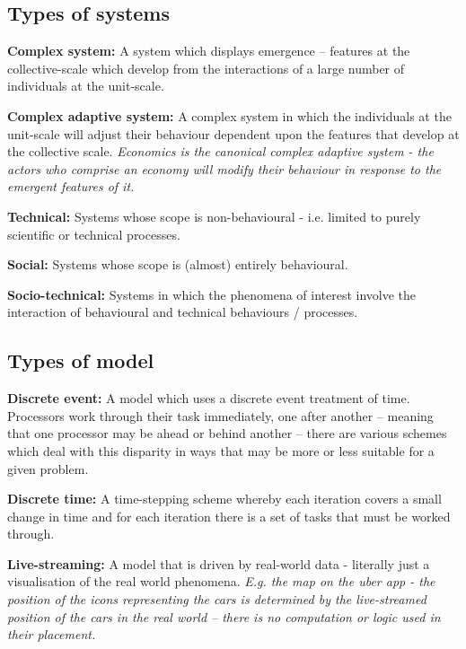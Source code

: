 \subsection{Types of systems}

\noindent \textbf{Complex system:} A system which displays emergence -- features
at the collective-scale which develop from the interactions of a large number
of individuals at the unit-scale.

\noindent \textbf{Complex adaptive system:} A complex system in which the individuals at the
unit-scale will adjust their behaviour dependent upon the features that develop
at the collective scale. \textit{Economics is the canonical complex adaptive system -
the actors who comprise an economy will modify their behaviour in response to
the emergent features of it.}

\noindent \textbf{Technical:} Systems whose scope is non-behavioural - i.e. limited to purely
scientific or technical processes.

\noindent \textbf{Social:} Systems whose scope is (almost) entirely behavioural.

\noindent \textbf{Socio-technical:} Systems in which the phenomena of interest involve the
interaction of behavioural and technical behaviours / processes.

\subsection{Types of model}

\noindent \textbf{Discrete event:} A model which uses a discrete event treatment of
time. Processors work through their task immediately, one after another --
meaning that one processor may be ahead or behind another -- there are various
schemes which deal with this disparity in ways that may be more or less
suitable for a given problem.

\noindent \textbf{Discrete time:} A time-stepping scheme whereby each iteration covers a small
change in time and for each iteration there is a set of tasks that must be
worked through.

\noindent \textbf{Live-streaming:} A model that is driven by real-world data - literally just a
visualisation of the real world phenomena.  \textit{E.g. the map on the uber app - the
position of the icons representing the cars is determined by the live-streamed
position of the cars in the real world -- there is no computation or logic used
in their placement.}

